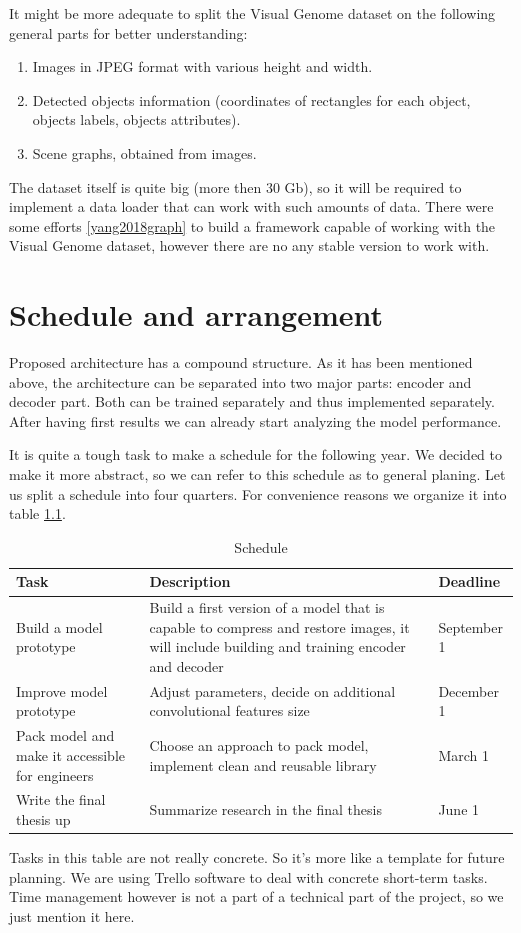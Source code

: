 It might be more adequate to split the Visual Genome dataset on the following general parts for better understanding:

\begin{enumerate}
    \item Images in JPEG format with various height and width.
    \item Detected objects information (coordinates of rectangles for each object, objects labels, objects attributes).
    \item Scene graphs, obtained from images.
\end{enumerate}

The dataset itself is quite big (more then 30 Gb), so it will be required to implement a data loader that can work with such amounts of data. There were some efforts \ref{yang2018graph} to build a framework capable of working with the Visual Genome dataset, however there are no any stable version to work with.

\chapter{Schedule and arrangement}

Proposed architecture has a compound structure. As it has been mentioned above, the architecture can be separated into two major parts: encoder and decoder part. Both can be trained separately and thus implemented separately. After having first results we can already start analyzing the model performance.

It is quite a tough task to make a schedule for the following year. We decided to make it more abstract, so we can refer to this schedule as to general planing. Let us split a schedule into four quarters. For convenience reasons we organize it into table \ref{tab:schedule}.

\begin{table}
    \centering
    \caption{Schedule}
    \label{tab:schedule}
    \begin{tabular}{p{4cm}|p{8cm}|p{2cm}}
        \hline
        Task & Description & Deadline \\
        \hline
        Build a model prototype & Build a first version of a model that is capable to compress and restore images, it will include building and training encoder and decoder & September 1 \\
        \hline
        Improve model prototype & Adjust parameters, decide on additional convolutional features size & December 1 \\
        \hline
        Pack model and make it accessible for engineers & Choose an approach to pack model, implement clean and reusable library & March 1 \\
        \hline
        Write the final thesis up & Summarize research in the final thesis & June 1 \\
        \hline
    \end{tabular}
\end{table}

Tasks in this table are not really concrete. So it's more like a template for future planning. We are using Trello software to deal with concrete short-term tasks. Time management however is not a part of a technical part of the project, so we just mention it here.